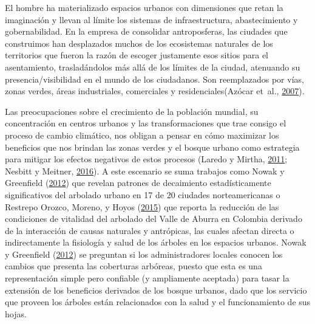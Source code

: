 \documentclass[12pt,a4paper,oneside, openany]{book}
\theoremstyle{definition}
\theoremstyle{definition}
\theoremstyle{definition}
\theoremstyle{remark}
\begin{document}
El hombre ha materializado espacios urbanos con dimensiones que retan la
imaginación y llevan al límite los sistemas de infraestructura,
abastecimiento y gobernabilidad. En la empresa de consolidar
antroposferas, las ciudades que construimos han desplazados muchos de
los ecosistemas naturales de los territorios que fueron la razón de
escoger justamente esos sitios para el asentamiento, trasladándolos más
allá de los límites de la ciudad, atenuando su presencia/visibilidad en
el mundo de los ciudadanos. Son reemplazados por vías, zonas verdes,
áreas industriales, comerciales y residenciales(Azócar et~al.,
\protect\hyperlink{ref-azocar_urbanization_2007}{2007}).

Las preocupaciones sobre el crecimiento de la población mundial, su
concentración en centros urbanos y las transformaciones que trae consigo
el proceso de cambio climático, nos obligan a pensar en cómo maximizar
los beneficios que nos brindan las zonas verdes y el bosque urbano como
estrategia para mitigar los efectos negativos de estos procesos (Laredo
y Mirtha, \protect\hyperlink{ref-laredo_gestion_2011}{2011}; Nesbitt y
Meitner, \protect\hyperlink{ref-nesbitt_exploring_2016}{2016}). A este
escenario se suma trabajos como Nowak y Greenfield
(\protect\hyperlink{ref-nowak_tree_2012}{2012}) que revelan patrones de
decaimiento estadísticamente significativos del arbolado urbano en 17 de
20 ciudades norteamericanas o Restrepo Orozco, Moreno, y Hoyos
(\protect\hyperlink{ref-restrepo_incidence_2015}{2015}) que reporta la
reducción de las condiciones de vitalidad del arbolado del Valle de
Aburra en Colombia derivado de la interacción de causas naturales y
antrópicas, las cuales afectan directa o indirectamente la fisiología y
salud de los árboles en los espacios urbanos. Nowak y Greenfield
(\protect\hyperlink{ref-nowak_tree_2012}{2012}) se preguntan si los
administradores locales conocen los cambios que presenta las coberturas
arbóreas, puesto que esta es una representación simple pero confiable (y
ampliamente aceptada) para tasar la extensión de los beneficios
derivados de los bosque urbanos, dado que los servicio que proveen los
árboles están relacionados con la salud y el funcionamiento de sus
hojas.
\end{document}
